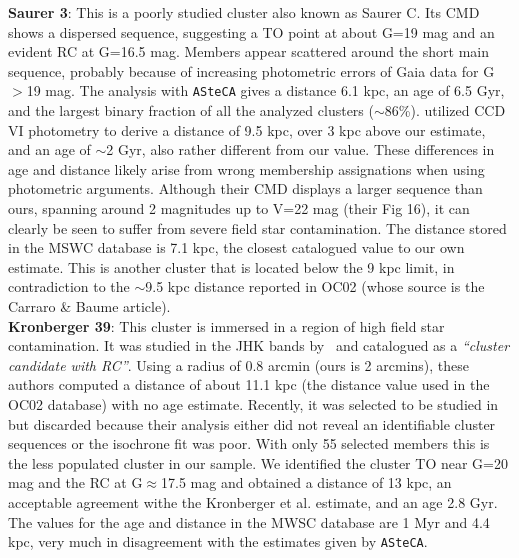 \documentclass[referee]{aa}
\begin{document}
\begin{appendix}
  \noindent \textbf{Saurer 3}: This is a poorly studied cluster also known as Saurer C.
  Its CMD shows a dispersed sequence, suggesting a TO point at about G=19 mag
  and an evident RC at G=16.5 mag. Members appear scattered around the short
  main sequence, probably because of increasing photometric errors of Gaia data
  for G$>$19 mag.
  The analysis with \texttt{ASteCA} gives a distance 6.1 kpc, an age of 6.5
  Gyr, and the largest binary fraction of all the analyzed clusters 
  ($\sim$86\%).
  \cite{Carraro_2003} utilized CCD VI photometry to derive a distance of 9.5
  kpc, over 3 kpc above our estimate, and an age of $\sim$2 Gyr, also rather
  different from our value. These differences in age and distance likely
  arise from wrong membership assignations when using photometric
  arguments. Although their CMD displays a larger sequence than
  ours, spanning around 2 magnitudes up to V=22 mag (their Fig 16), it can
  clearly be seen to suffer from severe field star contamination.
  The distance stored in the MSWC database is 7.1 kpc, the closest catalogued
  value to our own estimate. This is another cluster that is located below the 9
  kpc limit, in contradiction to the $\sim$9.5 kpc distance reported in
  OC02 (whose source is the Carraro \& Baume article).\\

  \noindent \textbf{Kronberger 39}: This cluster is immersed in a region of high field
  star contamination. It was studied in the JHK bands by~\cite{Kronberger_2006}
  and catalogued as a \emph{``cluster candidate with RC''}. Using a radius of 0.8
  arcmin (ours is 2 arcmins), these authors computed a distance of about 11.1
  kpc (the distance value used in the OC02 database) with no age estimate.
  Recently, it was selected to be studied in~\cite{Monteiro_2020} but
  discarded because their analysis either did not reveal an identifiable cluster
  sequences or the isochrone fit was poor.
  With only 55 selected members this is the less populated cluster in our
  sample. We identified the cluster TO near G=20 mag and the RC at
  G$\approx$17.5 mag and obtained a distance of 13 kpc, an acceptable
  agreement withe the Kronberger et al. estimate, and an age 2.8 Gyr.
  The values for the age and distance in the MWSC database are 1 Myr and 4.4
  kpc, very much in disagreement with the estimates given by \texttt{ASteCA}.\\


\end{appendix}
\end{document}
